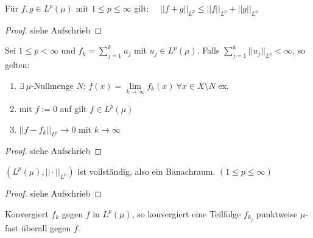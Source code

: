   \begin{theorem}
    Für $f,g \in L^p(\mu)$ mit $1 \leq p \leq \infty$ gilt: \ \ $|| f+g ||_{L^p} \leq ||f||_{L^p} + ||g||_{L^p}$
  \end{theorem}

  \begin{proof}
    siehe Aufschrieb
  \end{proof}

  \begin{lemma}
    Sei $1 \leq p < \infty$ und $f_k = \sum\limits_{j=1}^k u_j$ mit $u_j \in L^p(\mu)$. Falls $\sum\limits_{j=1}^k ||u_j||_{L^p} < \infty$, so gelten:
    \begin{enumerate}[label=\roman*)]
      \item $\exists \ \mu$-Nullmenge $N$: $f(x) = \lim\limits_{k \to \infty} f_k(x) \ \forall x \in X \setminus N$ ex.
      \item mit $f := 0$ auf gilt $f \in L^p(\mu)$
      \item $||f - f_k||_{L^p} \to 0$ mit $k \to \infty$
    \end{enumerate}
  \end{lemma}

  \begin{proof}
    siehe Aufschrieb
  \end{proof}


  \begin{theorem}
    $(L^p(\mu), ||\cdot||_{L^p})$ ist vollständig, also ein Banachraum. $(1 \leq p \leq \infty)$
  \end{theorem}
  \begin{proof}
    siehe Aufschrieb
  \end{proof}

  \begin{lemma}
    Konvergiert $f_k$ gegen $f$ in $L^p(\mu)$, so konvergiert eine Teilfolge $f_{k_j}$ punktweise $\mu$-fast überall gegen $f$.
  \end{lemma}  
  
